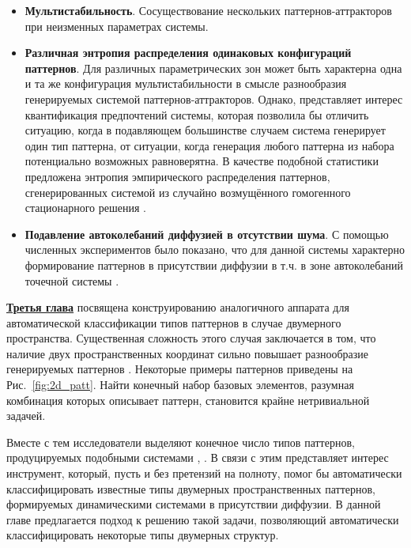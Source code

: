 \begin{itemize}
    \item \textbf{Мультистабильность}. Сосуществование нескольких паттернов-аттракторов при неизменных параметрах системы.
    \item \textbf{Различная энтропия распределения одинаковых конфигураций паттернов}. Для различных параметрических зон может быть характерна одна и та же конфигурация мультистабильности в смысле разнообразия генерируемых системой паттернов-аттракторов. Однако, представляет интерес квантификация предпочтений системы, которая позволила бы отличить ситуацию, когда в подавляющем большинстве случаем система генерирует один тип паттерна, от ситуации, когда генерация любого паттерна из набора потенциально возможных равноверятна. В качестве подобной статистики предложена энтропия \cite{shannon1948mathematical} эмпирического распределения паттернов, сгенерированных системой из случайно возмущённого гомогенного стационарного решения \cite{bib5}.
    \item \textbf{Подавление автоколебаний диффузией в отсутствии шума}. С помощью численных экспериментов было показано, что для данной системы характерно формирование паттернов в присутствии диффузии в т.ч. в зоне автоколебаний точечной системы \cite{bib5}.
\end{itemize}

\underline{\textbf{Третья глава}} посвящена конструированию аналогичного аппарата для автоматической классификации типов паттернов в случае двумерного пространства. Существенная сложность этого случая заключается в том, что наличие двух пространственных координат сильно повышает разнообразие генерируемых паттернов \cite{vanag2004waves}. Некоторые примеры паттернов приведены на Рис.~\ref{fig:2d_patt}. Найти конечный набор базовых элементов, разумная комбинация которых описывает паттерн, становится крайне нетривиальной задачей. 

\begin{figure}[ht]   
\end{figure}

Вместе с тем исследователи выделяют конечное число типов паттернов, продуцируемых подобными системами \cite{vanag2008book}, \cite{maini2019turing}. В связи с этим представляет интерес инструмент, который, пусть и без претензий на полноту, помог бы автоматически классифицировать известные типы двумерных пространственных паттернов, формируемых динамическими системами в присутствии диффузии. В данной главе предлагается подход к решению такой задачи, позволяющий автоматически классифицировать некоторые типы двумерных структур.

